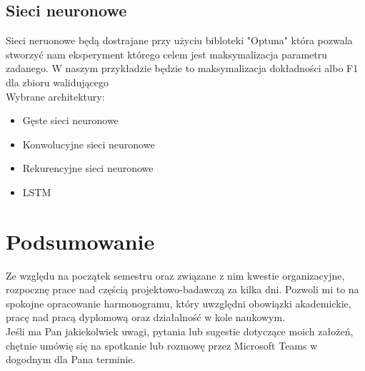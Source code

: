 \documentclass[12pt,titlepage]{article}
\begin{document}
\subsection{Sieci neuronowe}
Sieci neruonowe będą dostrajane przy użyciu bibloteki "Optuna" która pozwala stworzyć nam eksperyment którego celem jest maksymalizacja parametru zadanego. W naszym przykładzie będzie to maksymalizacja dokładności albo F1 dla zbioru walidującego\\

Wybrane architektury:
\begin{itemize}
    \item Gęste sieci neuronowe
    \item Konwolucyjne sieci neuronowe
    \item Rekurencyjne sieci neuronowe
    \item LSTM
\end{itemize}

\section{Podsumowanie}
Ze względu na początek semestru oraz związane z nim kwestie organizacyjne, rozpocznę prace nad częścią projektowo-badawczą za kilka dni. Pozwoli mi to na spokojne opracowanie harmonogramu, który uwzględni obowiązki akademickie, pracę nad pracą dyplomową oraz działalność w kole naukowym.\\

Jeśli ma Pan jakiekolwiek uwagi, pytania lub sugestie dotyczące moich założeń, chętnie umówię się na spotkanie lub rozmowę przez Microsoft Teams w dogodnym dla Pana terminie.
\end{document}
